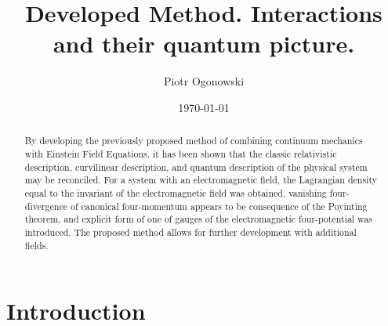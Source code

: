\documentclass[aps,prx,preprint,groupedaddress,showkeys]{revtex4-2}
\begin{document}
\title{Developed Method. Interactions and their quantum picture.}
\author{Piotr Ogonowski}


\date{\today}

\begin{abstract}
By developing the previously proposed method of combining continuum mechanics with Einstein Field Equations, it has been shown that the classic relativistic description, curvilinear description, and quantum description of the physical system may be reconciled. For a system with an electromagnetic field, the Lagrangian density equal to the invariant of the electromagnetic field was obtained, vanishing four-divergence of canonical four-momentum appears to be consequence of the Poyinting theorem, and explicit form of one of gauges of the electromagnetic four-potential was introduced. The proposed method allows for further development with additional fields.
\end{abstract}


\maketitle

\section{Introduction}
\end{document}
